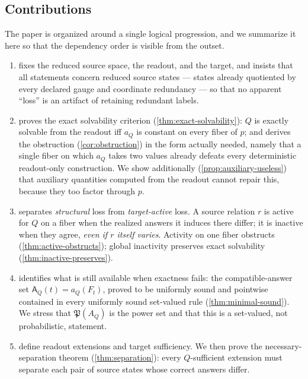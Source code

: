 \documentclass[11pt,reqno]{amsart}
\theoremstyle{plain}
\theoremstyle{definition}
\newcommand{\Pow}{\mathfrak{P}}          %
\newcommand{\CompatSet}{\mathsf{A}}      %
\begin{document}
\subsection{Contributions}

The paper is organized around a single logical progression, and we summarize it here so that the
dependency order is visible from the outset.

\begin{enumerate}
\item {} fixes the reduced source space, the readout, and the target, and insists
that all statements concern reduced source states --- states already quotiented by every declared
gauge and coordinate redundancy --- so that no apparent ``loss'' is an artifact of retaining
redundant labels.

\item {} proves the exact solvability criterion
(\cref{thm:exact-solvability}): $Q$ is exactly solvable from the readout iff $a_Q$ is constant
on every fiber of $p$; and derives the obstruction (\cref{cor:obstruction}) in the form actually
needed, namely that a single fiber on which $a_Q$ takes two values already defeats every
deterministic readout-only construction. We show additionally
(\cref{prop:auxiliary-useless}) that auxiliary quantities computed from the readout cannot repair
this, because they too factor through $p$.

\item {} separates \emph{structural} loss from \emph{target-active} loss. A
source relation $r$ is active for $Q$ on a fiber when the realized answers it induces there
differ; it is inactive when they agree, \emph{even if $r$ itself varies}. Activity on one fiber
obstructs (\cref{thm:active-obstructs}); global inactivity preserves exact solvability
(\cref{thm:inactive-preserves}).

\item {} identifies what is still available when exactness fails: the
compatible-answer set $\CompatSet_Q(t)=a_Q(F_t)$, proved to be uniformly sound and pointwise
contained in every uniformly sound set-valued rule (\cref{thm:minimal-sound}). We stress that
$\Pow(A_Q)$ is the power set and that this is a set-valued, not probabilistic, statement.

\item {} define readout extensions and target sufficiency.
We then prove the necessary-separation theorem (\cref{thm:separation}): every $Q$-sufficient
extension must separate each pair of source states whose correct answers differ.


\end{enumerate}
\end{document}
